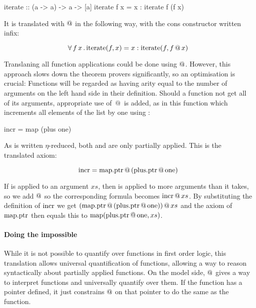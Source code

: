 \begin{code}
iterate :: (a -> a) -> a -> [a]
iterate f x = x : iterate f (f x)
\end{code}

It is translated with $@$ in the following way, with the cons
constructor \hs{:} written infix:

\begin{equation*}
\forall \, f \, x \, . \, \mathrm{iterate}(f,x) = x : \mathrm{iterate}(f,f \, @ \, x)
\end{equation*}

Translaning all function applications could be done using
$@$. However, this approach slows down the theorem provers
significantly, so an optimisation is crucial: Functions will be
regarded as having arity equal to the number of arguments on the left
hand side in their definition. Should a function not get all of its
arguments, appropriate use of $\, @ \, $ is added, as in this function
which increments all elements of the list by one using :

\begin{code}
incr = map (plus one)
\end{code}

As  is written $\eta$-reduced, both  and 
are only partially applied. This is the translated axiom:

\begin{equation*}
\mathrm{incr} = \mathrm{map.ptr} \, @ \, (\mathrm{plus.ptr} \, @ \, \mathrm{one})
\end{equation*}

If  is applied to an argument $xs$, then  is applied
to more arguments than it takes, so we add $@$ so the
corresponding formula becomes $\mathrm{incr} \, @ \, xs$. By substituting
the definition of $\mathrm{incr}$ we get
$(\mathrm{map.ptr} \, @ \, (\mathrm{plus.ptr} \, @ \, \mathrm{one})) \, @ \, xs$ and
the axiom of $\mathrm{map.ptr}$ then equals this to
$\mathrm{map}(\mathrm{plus.ptr} \, @ \, \mathrm{one},xs)$.

\paragraph{Doing the impossible}
While it is not possible to quantify over functions in first order
logic, this translation allows universal quantification of functions,
allowing a way to reason syntactically about partially applied
functions. On the model side, $@$ gives a way to interpret
functions and universally quantify over them. If the function has a
pointer defined, it just constrains $@$ on that pointer to do the
same as the function.

